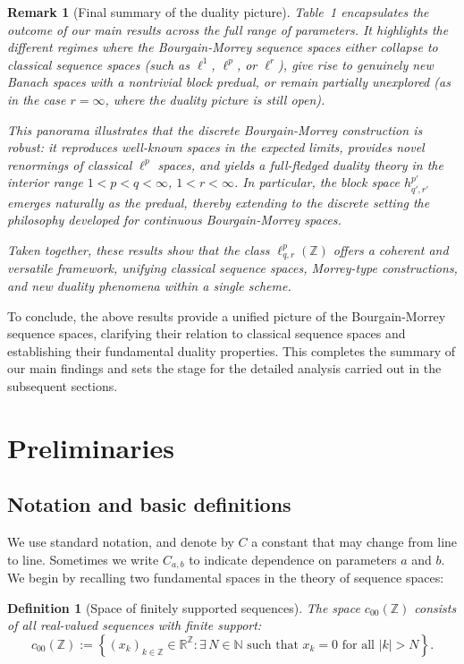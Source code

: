 \documentclass[preprint,12pt]{elsarticle}
\newtheorem{definition}[theorem]{Definition}
\newtheorem{remark}[theorem]{Remark}
\begin{document}
\begin{remark}[Final summary of the duality picture]
Table~1 encapsulates the outcome of our main results across the full range of parameters. 
It highlights the different regimes where the Bourgain-Morrey sequence spaces either 
collapse to classical sequence spaces (such as $\ell^1$, $\ell^p$, or $\ell^r$), 
give rise to genuinely new Banach spaces with a nontrivial block predual, 
or remain partially unexplored (as in the case $r=\infty$, where the duality 
picture is still open). 

This panorama illustrates that the discrete Bourgain-Morrey construction is robust: 
it reproduces well-known spaces in the expected limits, provides novel renormings 
of classical $\ell^p$ spaces, and yields a full-fledged duality theory in the 
interior range $1<p<q<\infty$, $1<r<\infty$. In particular, the block space 
$h^{p'}_{q',r'}$ emerges naturally as the predual, thereby extending to the 
discrete setting the philosophy developed for continuous Bourgain-Morrey spaces. 

Taken together, these results show that the class $\ell^p_{q,r}(\mathbb{Z})$ 
offers a coherent and versatile framework, unifying classical sequence spaces, 
Morrey-type constructions, and new duality phenomena within a single scheme.
\end{remark}
To conclude, the above results provide a unified picture of the Bourgain-Morrey 
sequence spaces, clarifying their relation to classical sequence spaces and 
establishing their fundamental duality properties. This completes the summary of 
our main findings and sets the stage for the detailed analysis carried out in the 
subsequent sections.

\section{Preliminaries}
\subsection{Notation and basic definitions}
\label{subsec:notation}
We use standard notation, and denote by $C$ a constant that may change from line to line. Sometimes we write $C_{a,b}$ to indicate dependence on parameters $a$ and $b$.
We begin by recalling two fundamental spaces in the theory of sequence spaces:

\begin{definition}[Space of finitely supported sequences]
The space $c_{00}(\mathbb{Z})$ consists of all real-valued sequences with finite support:
\[
c_{00}(\mathbb{Z}) := \left\{ (x_k)_{k \in \mathbb{Z}} \in \mathbb{R}^{\mathbb{Z}} : \exists\, N \in \mathbb{N} \text{ such that } x_k = 0 \text{ for all } |k| > N \right\}.
\]
\end{definition}
\end{document}
